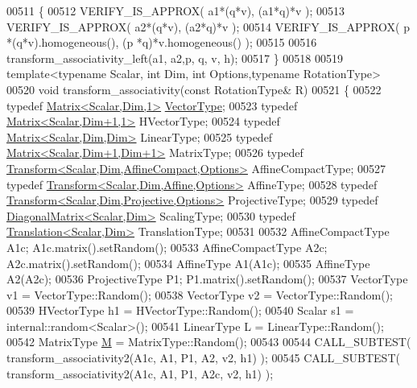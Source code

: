 \begin{DoxyCode}
00511 \{
00512   VERIFY\_IS\_APPROX( a1*(q*v), (a1*q)*v );
00513   VERIFY\_IS\_APPROX( a2*(q*v), (a2*q)*v );
00514   VERIFY\_IS\_APPROX( p *(q*v).homogeneous(), (p *q)*v.homogeneous() );
00515 
00516   transform\_associativity\_left(a1, a2,p, q, v, h);
00517 \}
00518 
00519 \textcolor{keyword}{template}<\textcolor{keyword}{typename} Scalar, \textcolor{keywordtype}{int} Dim, \textcolor{keywordtype}{int} Options,\textcolor{keyword}{typename} RotationType>
00520 \textcolor{keywordtype}{void} transform\_associativity(\textcolor{keyword}{const} RotationType& R)
00521 \{
00522   \textcolor{keyword}{typedef} \hyperlink{group___core___module}{Matrix<Scalar,Dim,1>} \hyperlink{struct_vector_type}{VectorType};
00523   \textcolor{keyword}{typedef} \hyperlink{group___core___module_class_eigen_1_1_matrix}{Matrix<Scalar,Dim+1,1>} HVectorType;
00524   \textcolor{keyword}{typedef} \hyperlink{group___core___module_class_eigen_1_1_matrix}{Matrix<Scalar,Dim,Dim>} LinearType;
00525   \textcolor{keyword}{typedef} \hyperlink{group___core___module_class_eigen_1_1_matrix}{Matrix<Scalar,Dim+1,Dim+1>} MatrixType;
00526   \textcolor{keyword}{typedef} \hyperlink{group___geometry___module_class_eigen_1_1_transform}{Transform<Scalar,Dim,AffineCompact,Options>} 
      AffineCompactType;
00527   \textcolor{keyword}{typedef} \hyperlink{group___geometry___module_class_eigen_1_1_transform}{Transform<Scalar,Dim,Affine,Options>} AffineType;
00528   \textcolor{keyword}{typedef} \hyperlink{group___geometry___module_class_eigen_1_1_transform}{Transform<Scalar,Dim,Projective,Options>} ProjectiveType;
00529   \textcolor{keyword}{typedef} \hyperlink{group___core___module_class_eigen_1_1_diagonal_matrix}{DiagonalMatrix<Scalar,Dim>} ScalingType;
00530   \textcolor{keyword}{typedef} \hyperlink{group___geometry___module_class_eigen_1_1_translation}{Translation<Scalar,Dim>} TranslationType;
00531 
00532   AffineCompactType A1c; A1c.matrix().setRandom();
00533   AffineCompactType A2c; A2c.matrix().setRandom();
00534   AffineType A1(A1c);
00535   AffineType A2(A2c);
00536   ProjectiveType P1; P1.matrix().setRandom();
00537   VectorType v1 = VectorType::Random();
00538   VectorType v2 = VectorType::Random();
00539   HVectorType h1 = HVectorType::Random();
00540   Scalar s1 = internal::random<Scalar>();
00541   LinearType L = LinearType::Random();
00542   MatrixType \hyperlink{group___core___module_class_eigen_1_1_matrix}{M} = MatrixType::Random();
00543 
00544   CALL\_SUBTEST( transform\_associativity2(A1c, A1, P1, A2, v2, h1) );
00545   CALL\_SUBTEST( transform\_associativity2(A1c, A1, P1, A2c, v2, h1) );

\end{DoxyCode}
